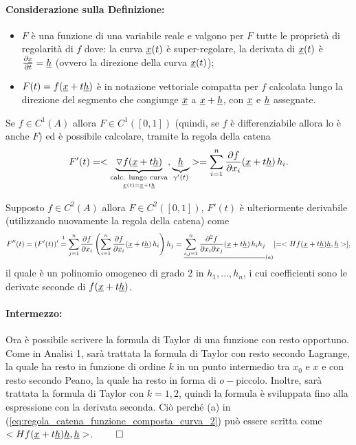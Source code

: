 \paragraph{Considerazione sulla Definizione:}
\begin{itemize}
	\item $F$ è una funzione di una variabile reale e valgono per $F$ tutte le proprietà di regolarità di $f$ dove: la curva $\uline x(t)$ è super-regolare, la derivata di $\uline x(t)$ è $\frac{\partial \uline x}{\partial t}=\uline h$ (ovvero la direzione della curva $\uline x(t)$);
	\item $F(t)=f(\uline x+t\uline h)$ è in notazione vettoriale compatta per $f$ calcolata lungo la direzione del segmento che congiunge $\uline x$ a $\uline x +\uline h$, con $\uline x$ e $\uline h$ assegnate.
\end{itemize}

\begin{property}\label{eq:proprieta_indotte_f_F}
	 Se $f\in C^1(A)$ allora $F\in C^1([0,1])$ (quindi, se $f$ è differenziabile allora lo è anche $F$) ed è possibile calcolare, tramite la regola della catena
	\begin{equation}\label{eq:regola_catena_funzione_composta_curva}
		F'(t) = <\underbrace{\triangledown f(\uline x+t\uline h)}_{\underset{\uline x(t)=\uline x+t\uline h}{\text{calc. lungo curva}}},\underbrace{\uline h}_{\gamma'(t)}>=\sum_{i=1}^{n}\frac{\partial f}{\partial x_i} (\uline x + t \uline h)\, h_i.
	\end{equation}
	
	Supposto $f\in C^2(A)$ allora $F\in C^2([0,1])$, $F'(t)$ è ulteriormente derivabile (utilizzando nuovamente la regola della catena) come
	\begin{equation}\label{eq:regola_catena_funzione_composta_curva_2}
		F''(t) = (F'(t))' \overset{\footnotemark}{=} \sum_{j=1}^{n}\frac{\partial f}{\partial x_i}  \left(\sum_{i=1}^{n}\frac{\partial f}{\partial x_i} (\uline x + t \uline h)\, h_i \right)h_j = \uline{\sum_{i,j=1}^{n} \frac{\partial^2 f}{\partial x_i \partial x_j} (\uline x + t \uline h)\, h_ih_j}_{(a)} [= <Hf(\uline x + t\uline h)\uline h, \uline h>],
	\end{equation}
	il quale è un polinomio omogeneo di grado 2 in $h_1,\hdots, h_n$, i cui coefficienti sono le derivate seconde di $f(\uline x + t \uline h)$.
\end{property}

\paragraph{Intermezzo:} Ora è possibile scrivere la formula di Taylor di una funzione con resto opportuno. Come in Analisi 1, sarà trattata la formula di Taylor con resto secondo Lagrange, la quale ha resto in funzione di ordine $k$ in un punto intermedio tra $x_0$ e $x$ e con resto secondo Peano, la quale ha resto in forma di $o-$piccolo. Inoltre, sarà trattata la formula di Taylor con $k=1,2$, quindi la formula è sviluppata fino alla espressione con la derivata seconda. Ciò perché (a) in (\ref{eq:regola_catena_funzione_composta_curva_2}) può essere scritta come $<Hf(\uline x + t\uline h)\uline h, \uline h>$. $\qed$

